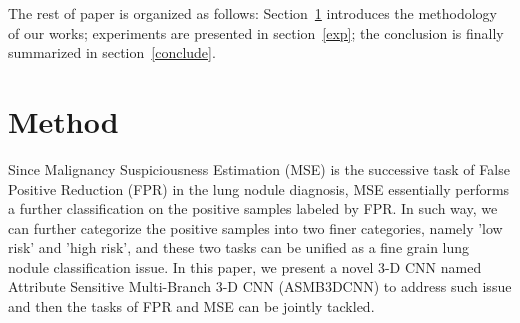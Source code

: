 \documentclass{article}
\begin{document}
The rest of paper is organized as follows: Section~\ref{method} introduces the methodology of our works; experiments are presented in section~\ref{exp}; the conclusion is finally summarized in section~\ref{conclude}.

\vspace{-0.5cm}
\section{Method}
\label{method}
\vspace{-0.3cm}
Since Malignancy Suspiciousness Estimation (MSE) is the successive task of False Positive Reduction (FPR) in the lung nodule diagnosis, MSE essentially performs a further classification on the positive samples labeled by FPR. In such way, we can further categorize the positive samples into two finer categories, namely 'low risk' and 'high risk', and these two tasks can be unified as a fine grain lung nodule classification issue. In this paper, we present a novel 3-D CNN named  Attribute Sensitive Multi-Branch 3-D CNN (ASMB3DCNN) to address such issue and then the tasks of FPR and MSE can be jointly tackled.
\vspace{-0.4cm}
\end{document}
